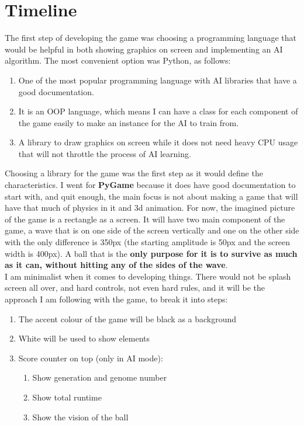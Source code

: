 
\chapter{Timeline}
The first step of developing the game was choosing a programming language that would be helpful in both showing graphics on screen and implementing an AI algorithm. The most convenient option was Python, as follows:

\begin{enumerate}
	\item One of the most popular programming language with AI libraries that have a good documentation.
	\item It is an OOP language, which means I can have a class for each component of the game easily to make an instance for the AI to train from.
	\item A library to draw graphics on screen while it does not need heavy CPU usage that will not throttle the process of AI learning.
\end{enumerate}

Choosing a library for the game was the first step as it would define the characteristics. I went for \textbf{PyGame} because it does have good documentation to start with, and quit enough, the main focus is not about making a game that will have that much of physics in it and 3d animation. For now, the imagined picture of the game is a rectangle as a screen. It will have two main component of the game, a wave that is on one side of the screen vertically and one on the other side with the only difference is 350px (the starting amplitude is 50px and the screen width is 400px). A ball that is the \textbf{only purpose for it is to survive as much as it can, without hitting any of the sides of the wave}.\\


I am minimalist when it comes to developing things. There would not be splash screen all over, and hard controls, not even hard rules, and it will be the approach I am following with the game, to break it into steps:

\begin{enumerate}
	\item The accent colour of the game will be black as a background
	\item White will be used to show elements 
	\item Score counter on top (only in AI mode):
	  \begin{enumerate}
		\item Show generation and genome number
		\item Show total runtime
		\item Show the vision of the ball
	\end{enumerate}
\end{enumerate}


